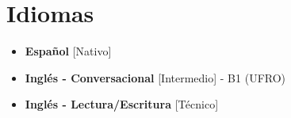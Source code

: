 \documentclass[11pt,a4paper,sans]{moderncv}
\newcommand{\sectionMargin}{-3mm}
\begin{document}
\vspace*{\sectionMargin}

\section{Idiomas}{
    \begin{multicols}{2}
        \begin{itemize}[label=\textbullet]
        \item \textbf{Español} [Nativo]
        \item \textbf{Inglés - Conversacional} [Intermedio] - B1 (UFRO)
        \item \textbf{Inglés - Lectura/Escritura} [Técnico]
        \end{itemize}
    \end{multicols}
}
\end{document}

